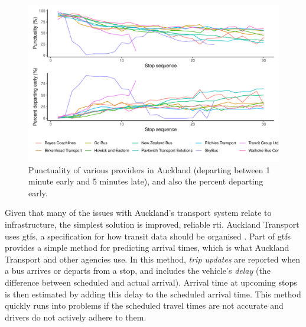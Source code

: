 \begin{knitrout}\small
{}\color{fgcolor}\begin{figure}
\includegraphics[width=\linewidth]{figure/schedule_adhere-1} \caption[Punctuality of various providers in Auckland (departing between 1 minute early and 5 minutes late), and also the percent departing early]{Punctuality of various providers in Auckland (departing between 1 minute early and 5 minutes late), and also the percent departing early.}\label{fig:schedule_adhere}
\end{figure}


\end{knitrout}



Given that many of the issues with Auckland's transport system relate to infrastructure, the simplest solution is improved, reliable \gls{rti}. Auckland Transport uses \gls{gtfs}, a specification for how transit data should be organised \citep{GoogleDevelopers_2006}. Part of \gls{gtfs} provides a simple method for predicting arrival times, which is what Auckland Transport and other agencies use. In this method, \emph{trip updates} are reported when a bus arrives or departs from a stop, and includes the vehicle's \emph{delay} (the difference between scheduled and actual arrival). Arrival time at upcoming stops is then estimated by adding this delay to the scheduled arrival time. This method quickly runs into problems if the scheduled travel times are not accurate and drivers do not actively adhere to them.


